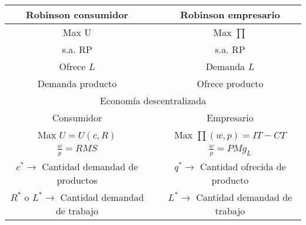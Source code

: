 \begin{center}
	\begingroup
		\setlength{\tabcolsep}{10pt} %
		\renewcommand{\arraystretch}{1.5} %
			\begin{tabular}{ccc}
					\hline
				Robinson consumidor & {} & Robinson empresario\\
				\hline
					Max U & {} & Max $\prod$\\
					s.a. RP & {} & s.a. RP\\
				Ofrece $L$ & {} &  Demanda $L$\\
				Demanda producto & {} &  Ofrece producto\\
					\hline
				\multicolumn{3}{c}{Economía descentralizada} \\
					\hline
				Consumidor 												& {} & Empresario\\
				Max $U = U\left( c, R\right)$ 							& {} & Max $\prod (w,p) = IT - CT$\\
				$\frac{w}{p} = RMS$ 									& {} & $\frac{w}{p} = PMg_L$\\
				$c^* \rightarrow$ Cantidad demandad de productos 		& {} & $q^* \rightarrow$ Cantidad ofrecida de producto\\
				$R^*$ o $L^* \rightarrow$ Cantidad demandad de trabajo	& {} & $L^* \rightarrow$ Cantidad demandad de trabajo \\
					\hline
			\end{tabular}
	\endgroup
\end{center}

